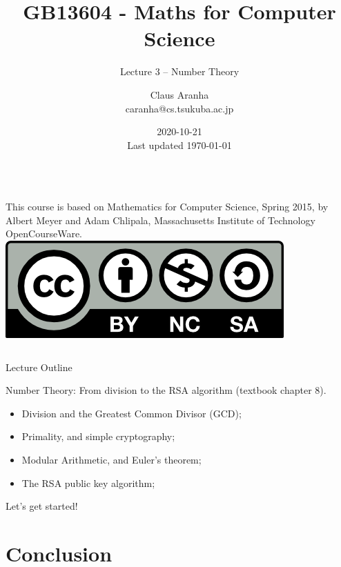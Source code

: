 \documentclass[aspectratio=169]{beamer}
\title[GB13604]{GB13604 - Maths for Computer Science}
\subtitle[]{Lecture 3 -- Number Theory}
\author[Claus Aranha]{Claus Aranha\\{\footnotesize caranha@cs.tsukuba.ac.jp}}
\institute[COINS]{College of Information Science}
\date[2020-10-21]{2020-10-21\\{\tiny Last updated \today}}
\begin{document}
\begin{frame}
  \maketitle

  \begin{columns}
    {\smaller This course is based on Mathematics for Computer Science, Spring
    2015, by Albert Meyer and Adam Chlipala, Massachusetts Institute
    of Technology OpenCourseWare.}
    \includegraphics[width=\textwidth]{../img/by-nc-sa}
  \end{columns}
\end{frame}

\begin{frame}{Lecture Outline}

  Number Theory: From division to the RSA algorithm (textbook chapter 8).\bigskip

  \begin{itemize}
    \item Division and the Greatest Common Divisor (GCD);
    \item Primality, and simple cryptography;
    \item Modular Arithmetic, and Euler's theorem;
    \item The RSA public key algorithm;
  \end{itemize}\bigskip

  Let's get started!
\end{frame}









\section{Conclusion}


\end{document}
